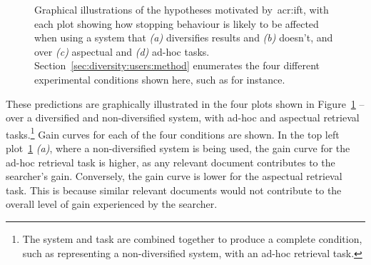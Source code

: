 \begin{figure}[t!]
    \centering
    \caption[\gls{acr:ift} and Diversification: Hypothesis Illustrations]{Graphical illustrations of the hypotheses motivated by~\gls{acr:ift}, with each plot showing how stopping behaviour is likely to be affected when using a system that \emph{(a)} diversifies results and \emph{(b)} doesn't, and over \emph{(c)} aspectual and \emph{(d)} ad-hoc tasks. Section~\ref{sec:diversity:users:method} enumerates the four different experimental conditions shown here, such as  for instance.}
    \label{fig:ift_theory}
\end{figure}

These predictions are graphically illustrated in the four plots shown in Figure~\ref{fig:ift_theory} -- over a diversified  and non-diversified  system, with ad-hoc  and aspectual  retrieval tasks.\footnote{The system and task are combined together to produce a complete condition, such as  representing a non-diversified system, with an ad-hoc retrieval task.} Gain curves for each of the four conditions are shown. In the top left plot~\ref{fig:ift_theory} \emph{(a)}, where a non-diversified system is being used, the gain curve for the ad-hoc retrieval task is higher, as any relevant document contributes to the searcher's gain. Conversely, the gain curve is lower for the aspectual retrieval task. This is because similar relevant documents would not contribute to the overall level of gain experienced by the searcher.

